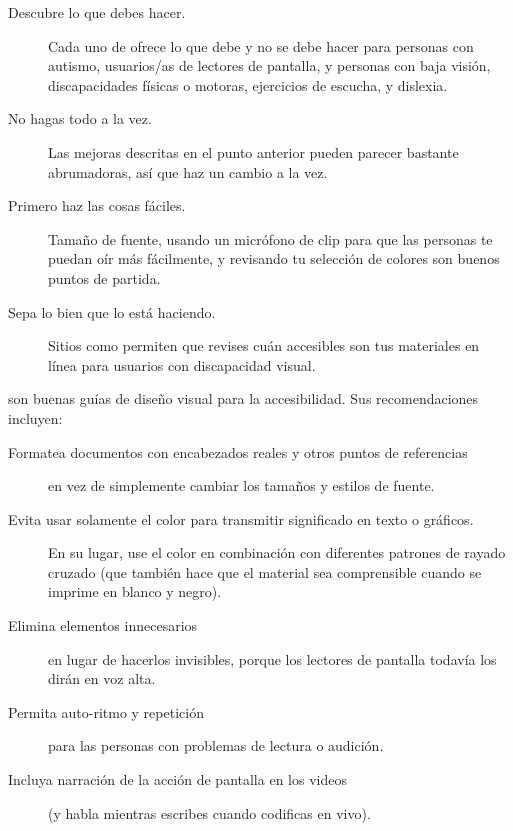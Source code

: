 \begin{description}

\item[Descubre lo que debes hacer.]
   Cada uno de 
  ofrece lo que debe y no se debe hacer para personas con autismo,
  usuarios/as de lectores de pantalla,
  y personas con baja visión,
  discapacidades físicas o motoras,
  ejercicios de escucha,
  y dislexia.

\item[No hagas todo a la vez.]
  Las mejoras descritas en el punto anterior pueden parecer bastante abrumadoras,
  así que haz un cambio a la vez.

\item[Primero haz las cosas fáciles.]
  Tamaño de fuente,
  usando un micrófono de clip para que las personas te puedan oír más fácilmente,
  y revisando tu selección de colores son buenos puntos de partida.

\item[Sepa lo bien que lo está haciendo.]
  Sitios como  permiten que revises
  cuán accesibles son tus materiales en línea para usuarios con discapacidad visual.

\end{description}

\cite{Coom2012,Burg2015} son buenas guías de diseño visual para la accesibilidad.
Sus recomendaciones incluyen:

\begin{description}

\item[Formatea documentos con encabezados reales y otros puntos de referencias]
  en vez de simplemente cambiar los tamaños y estilos de fuente.

\item[Evita usar solamente el color para transmitir significado en texto o gráficos.]
  En su lugar, use el color en combinación con diferentes patrones de rayado cruzado
  (que también hace que el material sea comprensible cuando se imprime en blanco y negro).

\item[Elimina elementos innecesarios]
  en lugar de hacerlos invisibles,
  porque los lectores de pantalla todavía los dirán en voz alta.

\item[Permita auto-ritmo y repetición]
  para las personas con problemas de lectura o audición.

\item[Incluya narración de la acción de pantalla en los videos]
  (y habla mientras escribes cuando codificas en vivo).

\end{description}

